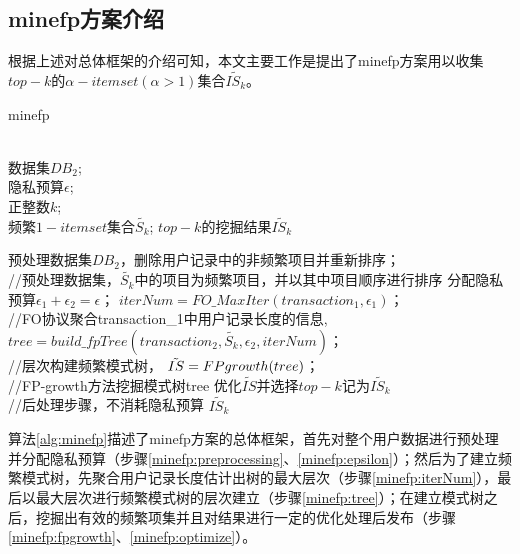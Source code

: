 \documentclass[UTF8]{ctexart}
\begin{document}
\subsection{minefp方案介绍}
\label{section:minefp}
根据上述对总体框架的介绍可知，本文主要工作是提出了minefp方案用以收集$top-k$的$\alpha -itemset(\alpha>1)$集合$\tilde{IS_k}$。

\begin{algorithm}[t]
    \caption{minefp}
    \label{alg:minefp}
        \begin{algorithmic}[1]
			 \REQUIRE ~~\\
			 数据集$DB_2$;\\
			 隐私预算$\epsilon$;\\
			 正整数$k$;\\
			 频繁$1-itemset$集合$\tilde{S_k}$;
			 \ENSURE $top-k$的挖掘结果$\tilde{IS_k}$

                 \STATE 预处理数据集$DB_2$，删除用户记录中的非频繁项目并重新排序； \\ //预处理数据集，$\tilde{S_k}$中的项目为频繁项目，并以其中项目顺序进行排序   
                 \label{minefp:preprocessing} 
                 \STATE 分配隐私预算$\epsilon_1 + \epsilon_2 = \epsilon$；
                 \label{minefp:epsilon}            
			 \STATE $iterNum = FO\_MaxIter(transaction_1,\epsilon_1)$； \\ //FO协议聚合transaction\_1中用户记录长度的信息,%
			 \label{minefp:iterNum}
			 \STATE $tree = build\_fpTree(transaction_2,\tilde{S_k},\epsilon_2,iterNum)$； \\ //层次构建频繁模式树，%
			 \label{minefp:tree}
			 \STATE $\tilde{IS} = FP\-growth(tree)$； \\ //FP-growth方法挖掘模式树tree
                 \label{minefp:fpgrowth}
			 \STATE 优化$\tilde{IS}$并选择$top-k$记为$\tilde{IS_k}$ \\ //后处理步骤，不消耗隐私预算
                 \label{minefp:optimize}
                 \RETURN $\tilde{IS_k}$
        \end{algorithmic}
\end{algorithm}


算法\ref{alg:minefp}描述了minefp方案的总体框架，首先对整个用户数据进行预处理并分配隐私预算（步骤\ref{minefp:preprocessing}、\ref{minefp:epsilon}）；然后为了建立频繁模式树，先聚合用户记录长度估计出树的最大层次（步骤\ref{minefp:iterNum}），最后以最大层次进行频繁模式树的层次建立（步骤\ref{minefp:tree}）；在建立模式树之后，挖掘出有效的频繁项集并且对结果进行一定的优化处理后发布（步骤\ref{minefp:fpgrowth}、\ref{minefp:optimize}）。
\end{document}

